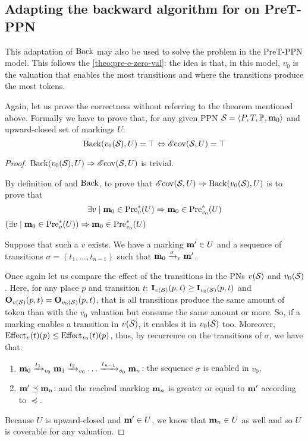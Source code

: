 
\subsection{Adapting the backward algorithm for \Ecov on PreT-\ac{PPN}}

This adaptation of $\back$ may also be used to solve the \Ecov problem in the PreT-\ac{PPN} model.
This follows the \autoref{theo:pre-e-zero-val}:
the idea is that, in this model, $v_0$ is the valuation that enables the most transitions and where the transitions produce the most tokens.

Again, let us prove the correctness without referring to the theorem mentioned above.
Formally we have to prove that, for any given \ac{PPN} $\defPPN$ and upward-closed set of markings $U$:
  \[
    \back(v_0(\namePPN), U) = \top \Leftrightarrow \EcovOp(\namePPN, U) = \top
  \]

\begin{proof}
  $\back(v_0(\namePPN), U) \Rightarrow \EcovOp(\namePPN, U)$ is trivial.

  By definition of \Ecov and $\back$, to prove that $\EcovOp(\namePPN, U) \Rightarrow \back(v_0(\namePPN), U)$ is to prove that
  \[
    \exists v \mid \mari \in \Pre^*_{v}(U) \Rightarrow \mari \in \Pre^*_{v_0}(U)
  \]
  $ \left( \exists v \mid \mari \in \Pre^*_{v}(U) \right) \Rightarrow \mari \in \Pre^*_{v_0}(U) $

  Suppose that such a $v$ exists. We have a marking $\marp \in U$ and a sequence of transitions $\sigma = (t_1, \dots, t_{n-1})$ such that $\mari \fire[v]{\sigma} \marp$.

  Once again let us compare the effect of the transitions in the \acp{PN} $v(\namePPN)$ and $v_0(\namePPN)$. Here, for any place $p$ and transition $t$: $\matI_{v(\namePPN)}(p,t) \geq \matI_{v_0(\namePPN)}(p,t)$ and $\matO_{v(\namePPN)}(p,t) = \matO_{v_0(\namePPN)}(p,t)$, that is all transitions produce the same amount of token than with the $v_0$ valuation but consume the same amount or more. So, if a marking enables a transition in $v(\namePPN)$, it enables it in $v_0(\namePPN)$ too. Moreover, $\Effect_v(t)(p) \leq \Effect_{v_0}(t)(p)$, thus, by recurrence on the transitions of $\sigma$, we have that:
  \begin{enumerate}
    \item $\mari \fire[{v_0}]{t_1} \mar_1 \fire[{v_0}]{t_2} \dots \fire[v_0]{t_{n-1}} \mar_n$: the sequence $\sigma$ is enabled in $v_0$,
    \item $\marp \preceq \mar_n$: and the reached marking $\mar_n$ is greater or equal to $\marp$ according to $\preceq$.
  \end{enumerate}

  Because $U$ is upward-closed and $\marp \in U$, we know that $\mar_n \in U$ as well and so $U$ is coverable for any valuation.
\end{proof}

